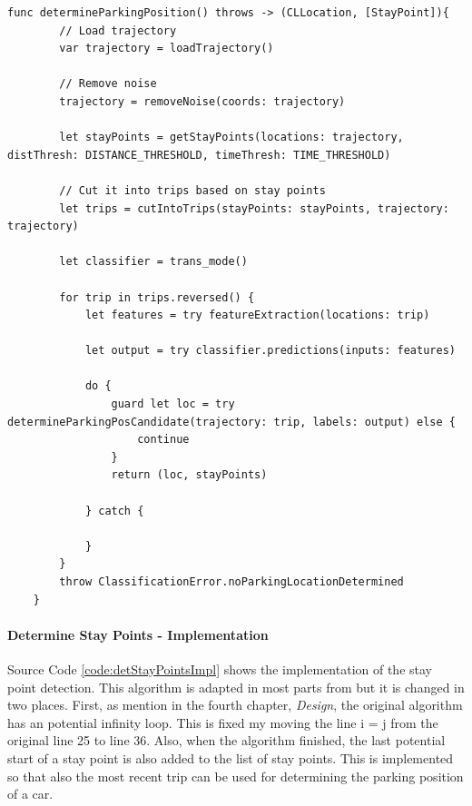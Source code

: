 \begin{lstlisting}[style=swift, caption={Implementation of Algorithm to Determine Parking Position of the User's Car}, label={code:detParkPosImpl}]
func determineParkingPosition() throws -> (CLLocation, [StayPoint]){
        // Load trajectory
        var trajectory = loadTrajectory()
        
        // Remove noise
        trajectory = removeNoise(coords: trajectory)
        
        let stayPoints = getStayPoints(locations: trajectory, distThresh: DISTANCE_THRESHOLD, timeThresh: TIME_THRESHOLD)
        
        // Cut it into trips based on stay points
        let trips = cutIntoTrips(stayPoints: stayPoints, trajectory: trajectory)
        
        let classifier = trans_mode()
        
        for trip in trips.reversed() {
            let features = try featureExtraction(locations: trip)
            
            let output = try classifier.predictions(inputs: features)
            
            do {
                guard let loc = try determineParkingPosCandidate(trajectory: trip, labels: output) else {
                    continue
                }
                return (loc, stayPoints)
                
            } catch {
            
            }
        }
        throw ClassificationError.noParkingLocationDetermined
    }
\end{lstlisting}

\paragraph{Determine Stay Points - Implementation}
Source Code \ref{code:detStayPointsImpl} shows the implementation of the stay point detection. This algorithm is adapted in most parts from \cite{li2008mining} but it is changed in two places. First, as mention in the fourth chapter, \textit{Design}, the original algorithm has an potential infinity loop. This is fixed my moving the line i = j from the original line 25 to line 36. Also, when the algorithm finished, the last potential start of a stay point is also added to the list of stay points. This is implemented so that also the most recent trip can be used for determining the parking position of a car. 

